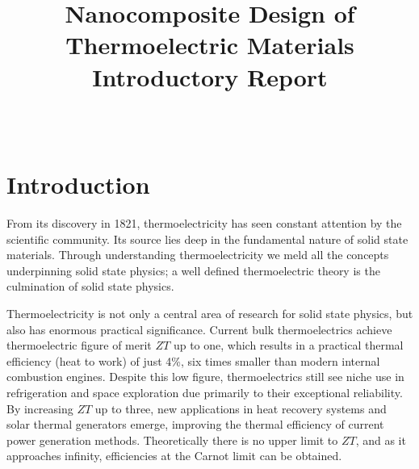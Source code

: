 \documentclass[a4paper,10pt,journal]{IEEEtran}
\begin{document}
\title{Nanocomposite Design of Thermoelectric Materials\\Introductory
Report}
\author{\\
}


\maketitle

\section{Introduction}

From its discovery in 1821, thermoelectricity has seen constant
attention by the scientific community. Its source lies deep in the
fundamental nature of solid state materials. Through understanding
thermoelectricity we meld all the concepts underpinning solid state
physics; a well defined thermoelectric theory is the culmination of
solid state physics.

Thermoelectricity is not only a central area of research for solid
state physics, but also has enormous practical significance. Current
bulk thermoelectrics achieve thermoelectric figure of merit $ZT$ up to
one, which results in a practical thermal efficiency (heat to work) of
just 4\%, six times smaller than modern internal combustion engines.
Despite this low figure, thermoelectrics still see niche use
in refrigeration and space exploration due primarily to their
exceptional reliability. By increasing $ZT$ up to three, new
applications in heat recovery systems and solar thermal generators
emerge, improving the thermal efficiency of current power generation
methods. Theoretically there is no upper limit to $ZT$, and as it
approaches infinity, efficiencies at the Carnot limit can be obtained.
\end{document}
